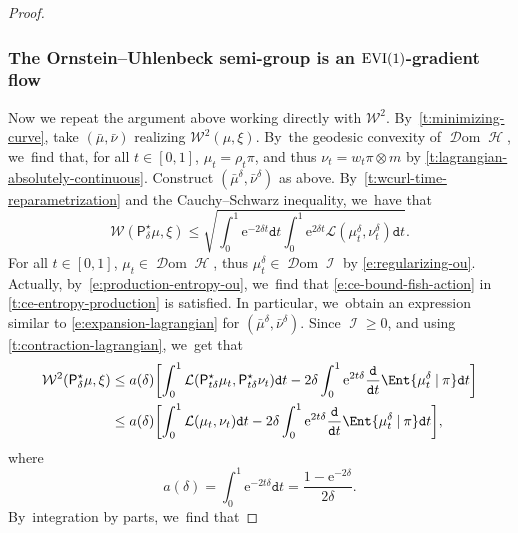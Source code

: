 \documentclass[JEP,XML,SOM,Unicode,published]{cedram}
\newcommand{\EVI}{\textup{EVI}}
\theoremstyle{definition}
\theoremstyle{remark}
\DeclarePairedDelimiter{\bracket}{\lbrack}{\rbrack}
\newcommand{\given}[1][]{%
\nonscript\:#1\vert
\allowbreak
\nonscript\:
\mathopen{}}
\DeclareMathOperator{\ent}{\mathcal{H}}
\DeclareMathOperator{\fish}{\mathcal{I}}
\DeclareMathOperator{\dom}{\mathscr{D}om}
\begin{document}
\begin{proof}
\subsubsection*{The Ornstein--Uhlenbeck semi-group is an $\EVI(1)$-gradient flow}
Now we repeat the argument above working directly with $\mathcal{W}^{2}$.
By~\cref{t:minimizing-curve}, take $(\bar{\mu}, \bar{\nu})$ realizing $\mathcal{W}^{2}(\mu, \xi)$.
By~the geodesic convexity of $\dom \ent$, we~find that, for all $t \in [0,1]$, $\mu_{t} = \rho_{t} \pi$, and thus $\nu_{t} = w_{t} \pi \otimes m$ by \cref{t:lagrangian-absolutely-continuous}.
Construct $(\bar{\mu}^{\delta}, \bar{\nu}^{\delta})$ as above.
By~\cref{t:wcurl-time-reparametrization} and the Cauchy--Schwarz inequality, we~have that
\begin{equation*}
\mathcal{W}(\mathsf{P}^{\star}_{\delta} \mu, \xi) \leq \sqrt{ \int_{0}^{1} \mathrm{e}^{-2\delta t} \mathtt{d} t \int_{0}^{1} \mathrm{e}^{2 \delta t} \mathcal{L}(\mu_{t}^{\delta}, \nu_{t}^{\delta}) \mathtt{d} t }.
\end{equation*}
For all $t \in [0,1]$, $\mu_{t} \in \dom \ent$, thus $\mu^{\delta}_{t} \in \dom \fish$ by \cref{e:regularizing-ou}.
Actually, by~\cref{e:production-entropy-ou}, we~find that \cref{e:ce-bound-fish-action} in \cref{t:ce-entropy-production} is satisfied.
In particular, we~obtain an expression similar to \cref{e:expansion-lagrangian} for $(\bar{\mu}^{\delta}, \bar{\nu}^{\delta})$.
Since $\fish \geq 0$, and using \cref{t:contraction-lagrangian}, we~get that
\begin{equation}\label{e:bound-w-delta}
\begin{split}
\mathcal{W}^{2}(\mathsf{P}^{\star}_{\delta} \mu, \xi) & \leq a(\delta) \bracket*{ \int_{0}^{1} \mathcal{L}(\mathsf{P}^{\star}_{t\delta} \mu_{t}, \mathsf{P}^{\star}_{t\delta} \nu_{t}) \mathtt{d} t - 2 \delta \int_{0}^{1} \mathrm{e}^{2t\delta} \frac{\mathtt{d}}{\mathtt{d} t} \Ent{ \mu_{t}^{\delta} \given \pi } \mathtt{d} t }
\\& \leq a(\delta) \bracket*{ \int_{0}^{1} \mathcal{L}(\mu_{t}, \nu_{t}) \mathtt{d} t - 2 \delta \int_{0}^{1} \mathrm{e}^{2t\delta} \frac{\mathtt{d}}{\mathtt{d} t} \Ent{ \mu_{t}^{\delta} \given \pi } \mathtt{d} t },
\end{split}
\end{equation}
where
\begin{equation*}
a(\delta) = \int_{0}^{1} \mathrm{e}^{-2t\delta} \mathtt{d} t = \frac{1 - \mathrm{e}^{-2\delta}}{2\delta}.
\end{equation*}
By~integration by parts, we~find that

\end{proof}
\end{document}
